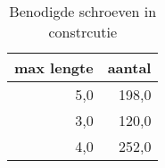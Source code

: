 \begin{table}[h!]
\centering
\caption{Benodigde schroeven in constrcutie}
\begin{tabular}{rr}
\toprule
 max lengte &  aantal \\
\midrule
        5,0 &   198,0 \\
        3,0 &   120,0 \\
        4,0 &   252,0 \\
\bottomrule
\end{tabular}
\end{table}
